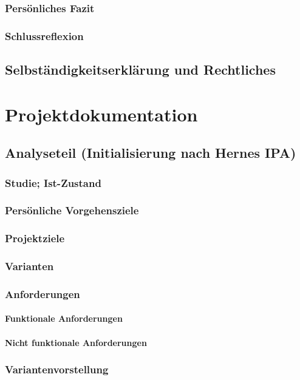 \documentclass{report}
\begin{document}
\section{Persönliches Fazit}
\section{Schlussreflexion}

\chapter{Selbständigkeitserklärung und Rechtliches}

\part{Projektdokumentation}

\chapter{Analyseteil (Initialisierung nach Hernes IPA)}
\section{Studie; Ist-Zustand}
\section{Persönliche Vorgehensziele}
\section{Projektziele}
\section{Varianten}
\section{Anforderungen}
\subsection{Funktionale Anforderungen}
\subsection{Nicht funktionale Anforderungen}
\section{Variantenvorstellung}
\end{document}
